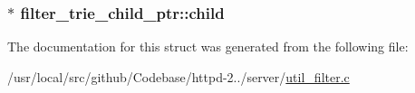 \subsubsection[{\texorpdfstring{child}{child}}]{$\ast$ filter\+\_\+trie\+\_\+child\+\_\+ptr\+::child}\hypertarget{structfilter__trie__child__ptr_a5804a089566068fc0b1488d474bac67c}{}\label{structfilter__trie__child__ptr_a5804a089566068fc0b1488d474bac67c}


The documentation for this struct was generated from the following file\+:\begin{DoxyCompactItemize}
\item 
/usr/local/src/github/\+Codebase/httpd-\/2../server/\hyperlink{util__filter_8c}{util\+\_\+filter.\+c}\end{DoxyCompactItemize}
